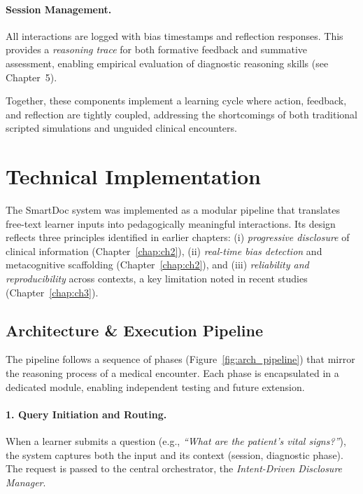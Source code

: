 \paragraph{Session Management.}
All interactions are logged with bias timestamps and reflection responses. This provides a \emph{reasoning trace} for both formative feedback and summative assessment, enabling empirical evaluation of diagnostic reasoning skills (see Chapter~5).

\medskip
Together, these components implement a learning cycle where action, feedback, and reflection are tightly coupled, addressing the shortcomings of both traditional scripted simulations and unguided clinical encounters.

\section{Technical Implementation}
\label{sec:technical_implementation}

The SmartDoc system was implemented as a modular pipeline that translates free-text
learner inputs into pedagogically meaningful interactions. Its design reflects three
principles identified in earlier chapters: (i) \emph{progressive disclosure} of
clinical information (Chapter~\ref{chap:ch2}), (ii) \emph{real-time bias detection}
and metacognitive scaffolding (Chapter~\ref{chap:ch2}), and (iii) \emph{reliability
and reproducibility} across contexts, a key limitation noted in recent studies
(Chapter~\ref{chap:ch3}).

\subsection{Architecture \& Execution Pipeline}
\label{sec:execution_pipeline}

The pipeline follows a sequence of phases (Figure~\ref{fig:arch_pipeline}) that
mirror the reasoning process of a medical encounter. Each phase is encapsulated in
a dedicated module, enabling independent testing and future extension.


\paragraph{1. Query Initiation and Routing.}
When a learner submits a question (e.g., \textit{``What are the patient’s vital
signs?''}), the system captures both the input and its context (session, diagnostic
phase). The request is passed to the central orchestrator, the
\textit{Intent-Driven Disclosure Manager}.

